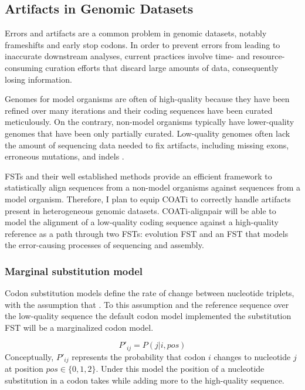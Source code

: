 \subsection{Artifacts in Genomic Datasets}

Errors and artifacts are a common problem in genomic datasets, notably
frameshifts and early stop codons.
In order to prevent errors from leading to inaccurate downstream analyses,
current practices involve time- and resource-consuming curation efforts that
discard large amounts of data, consequently losing information.

Genomes for model organisms are often of high-quality because they have been
refined over many iterations and their coding sequences have been curated
meticulously.
On the contrary, non-model organisms typically have lower-quality genomes that
have been only partially curated.
Low-quality genomes often lack the amount of sequencing data needed to fix
artifacts, including missing exons, erroneous mutations, and indels
.

FSTs and their well established methods provide an efficient framework to
statistically align sequences from a non-model organisms against sequences from
a model organism.
Therefore, I plan to equip COATi to correctly handle artifacts present in
heterogeneous genomic datasets.
COATi-alignpair will be able to model the alignment of a low-quality coding
sequence against a high-quality reference as a path through two FSTs: evolution
FST and an FST that models the error-causing processes of sequencing and
assembly.

\subsubsection{Marginal substitution model}

Codon substitution models define the rate of change between nucleotide triplets,
with the assumption that .
To  this assumption and  the reference
sequence over the low-quality sequence the default codon model implemented  the substitution FST will be a marginalized codon model.

\[ P'_{ij} = P(j | i, pos) \]
Conceptually, $P'_{ij}$ represents the probability that codon $i$ changes to
nucleotide $j$ at position $pos \in \{0,1,2\}$.
Under this model the position of a nucleotide substitution in a codon takes
 while adding more  to the
high-quality sequence.

